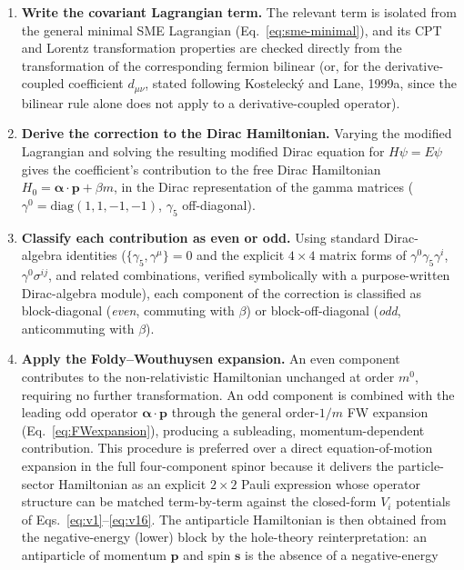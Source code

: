 \begin{enumerate}
  \item \textbf{Write the covariant Lagrangian term.} The relevant term is
    isolated from the general minimal SME Lagrangian
    (Eq.~\ref{eq:sme-minimal}), and its CPT and Lorentz transformation
    properties are checked directly from the transformation of the
    corresponding fermion bilinear (or, for the derivative-coupled
    coefficient $d_{\mu\nu}$, stated following Kostelecký and Lane, 1999a,
    since the bilinear rule alone does not apply to a derivative-coupled
    operator).
  \item \textbf{Derive the correction to the Dirac Hamiltonian.} Varying the
    modified Lagrangian and solving the resulting modified Dirac equation
    for $H\psi=E\psi$ gives the coefficient's contribution to the free Dirac
    Hamiltonian $H_0=\boldsymbol\alpha\cdot\mathbf p+\beta m$, in the Dirac
    representation of the gamma matrices ($\gamma^0=\mathrm{diag}(1,1,-1,-1)$,
    $\gamma_5$ off-diagonal).
  \item \textbf{Classify each contribution as even or odd.} Using standard
    Dirac-algebra identities ($\{\gamma_5,\gamma^\mu\}=0$ and the explicit
    $4\times4$ matrix forms of $\gamma^0\gamma_5\gamma^i$,
    $\gamma^0\sigma^{ij}$, and related combinations, verified symbolically
    with a purpose-written Dirac-algebra module), each component of the
    correction is classified as block-diagonal (\emph{even}, commuting with
    $\beta$) or block-off-diagonal (\emph{odd}, anticommuting with $\beta$).
  \item \textbf{Apply the Foldy--Wouthuysen expansion.} An even component
    contributes to the non-relativistic Hamiltonian unchanged at order
    $m^0$, requiring no further transformation. An odd component is
    combined with the leading odd operator $\boldsymbol\alpha\cdot\mathbf p$
    through the general order-$1/m$ FW expansion (Eq.~\ref{eq:FWexpansion}),
    producing a subleading, momentum-dependent contribution. This procedure
    is preferred over a direct equation-of-motion expansion in the full
    four-component spinor because it delivers the particle-sector
    Hamiltonian as an explicit $2\times2$ Pauli expression whose operator
    structure can be matched term-by-term against the closed-form $V_i$
    potentials of Eqs.~\ref{eq:v1}--\ref{eq:v16}. The antiparticle
    Hamiltonian is then obtained from the negative-energy (lower) block by
    the hole-theory reinterpretation: an antiparticle of momentum
    $\mathbf p$ and spin $\mathbf s$ is the absence of a negative-energy

\end{enumerate}
